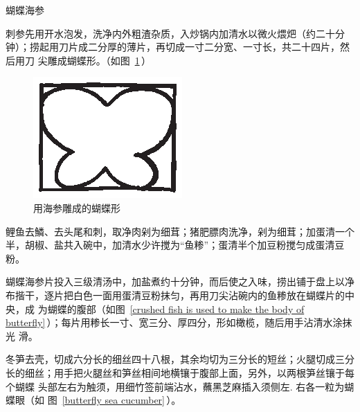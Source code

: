 \begin{recipe}{蝴蝶海参}

\ingredients


\preparation

\step 刺参先用开水泡发，洗净内外粗渣杂质，入炒锅内加清水以微火煨𤆵（约二十分
钟）；捞起用刀片成二分厚的薄片，再切成一寸二分宽、一寸长，共二十四片，然后用刀
尖雕成蝴蝶形。（如图~\ref{cutting sea cucumber into butterfly shape}\,）

\begin{figure}%
\begin{center}%
\vspace{-1.3125\baselineskip}%
\includegraphics[scale=1]{illustration-008.eps}%
\vspace{-.1875\baselineskip}%
\caption{用海参雕成的蝴蝶形}%
\label{cutting sea cucumber into butterfly shape}%
\end{center}%
\end{figure}

\step 鲤鱼去鱗、去头尾和刺，取净肉剁为细茸；猪肥膘肉洗净，剁为细茸；加蛋清一个
半，胡椒、盐共入碗中，加清水少许搅为“鱼糁”；蛋清半个加豆粉搅匀成蛋清豆粉。

\step 蝴蝶海参片投入三级清汤中，加盐煮约十分钟，而后使之入味，捞出铺于盘上以净
布揩干，逐片把白色一面用蛋清豆粉抹匀，再用刀尖沾碗内的鱼糁放在蝴蝶片的中央，成
为蝴蝶的腹部（如图~\ref{crushed fish is used to make the body of
butterfly}\,）；每片用糁长一寸、宽三分、厚四分，形如橄榄，随后用手沾清水涂抹光
滑。

\step 冬笋去壳，切成六分长的细丝四十八根，其余均切为三分长的短丝；火腿切成三分
长的细丝；用手把火腿丝和笋丝相间地横镶于腹部上面，另外，以两根笋丝镶于每个蝴蝶
头部左右为触须，用细竹签前端沾水，蘸黑芝麻插入须侧左. 右各一粒为蝴蝶眼（如
图~\ref{butterfly sea cucumber}\,）。


\end{recipe}
